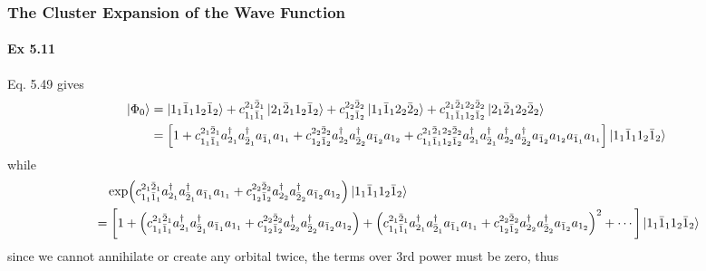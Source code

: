 \documentclass[a4paper]{article}
\newcommand{\ex}[1]{\paragraph{Ex #1}}
\numberwithin{equation}{subsection}
\begin{document}
\subsubsection{The Cluster Expansion of the Wave Function}
\ex{5.11}
Eq. 5.49 gives
\begin{align}
\ket{\Phi_0} &= \ket{1_1 \bar{1}_1 1_2 \bar{1}_2} 
+ c_{1_1 \bar{1}_1}^{2_1 \bar{2}_1} \ket{2_1\bar{2}_1 1_2\bar{1}_2}
+ c_{1_2 \bar{1}_2}^{2_2 \bar{2}_2} \ket{1_1\bar{1}_1 2_2\bar{2}_2}
+ c_{1_1 \bar{1}_1 1_2 \bar{1}_2}^{2_1 \bar{2}_1 2_2 \bar{2}_2} \ket{2_1\bar{2}_1 2_2\bar{2}_2} \notag\\
&= \qty[1
+ c_{1_1 \bar{1}_1}^{2_1 \bar{2}_1} a^\dagger_{2_1}a^\dagger_{\bar{2}_1} a_{\bar{1}_1}a_{1_1} 
+ c_{1_2 \bar{1}_2}^{2_2 \bar{2}_2} a^\dagger_{2_2}a^\dagger_{\bar{2}_2} a_{\bar{1}_2}a_{1_2}  
+ c_{1_1 \bar{1}_1 1_2 \bar{1}_2}^{2_1 \bar{2}_1 2_2 \bar{2}_2} a^\dagger_{2_1}a^\dagger_{\bar{2}_1}a^\dagger_{2_2}a^\dagger_{\bar{2}_2} a_{\bar{1}_2}a_{1_2}a_{\bar{1}_1}a_{1_1} ] \ket{1_1\bar{1}_1 1_2\bar{1}_2} %
\end{align}
while
\begin{align}
& \quad \exp(c_{1_1 \bar{1}_1}^{2_1 \bar{2}_1} a^\dagger_{2_1}a^\dagger_{\bar{2}_1} a_{\bar{1}_1}a_{1_1} + c_{1_2 \bar{1}_2}^{2_2 \bar{2}_2} a^\dagger_{2_2}a^\dagger_{\bar{2}_2} a_{\bar{1}_2}a_{1_2}
) \ket{1_1 \bar{1}_1 1_2 \bar{1}_2} \notag\\
&= \qty[ 1 
+ \qty(c_{1_1 \bar{1}_1}^{2_1 \bar{2}_1} a^\dagger_{2_1}a^\dagger_{\bar{2}_1} a_{\bar{1}_1}a_{1_1} + c_{1_2 \bar{1}_2}^{2_2 \bar{2}_2} a^\dagger_{2_2}a^\dagger_{\bar{2}_2} a_{\bar{1}_2}a_{1_2}) 
+ \qty(c_{1_1 \bar{1}_1}^{2_1 \bar{2}_1} a^\dagger_{2_1}a^\dagger_{\bar{2}_1} a_{\bar{1}_1}a_{1_1} + c_{1_2 \bar{1}_2}^{2_2 \bar{2}_2} a^\dagger_{2_2}a^\dagger_{\bar{2}_2} a_{\bar{1}_2}a_{1_2})^2 + \cdots
] \ket{1_1 \bar{1}_1 1_2 \bar{1}_2} %
\end{align}
since we cannot annihilate or create any orbital twice, the terms over 3rd power must be zero, thus
\end{document}
